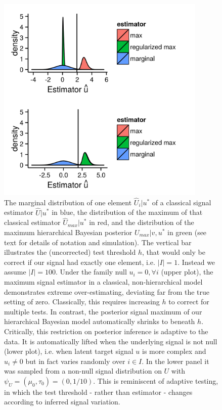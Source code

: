 \documentclass{article}
\begin{document}
\begin{figure}[]
\centering
\includegraphics[width=10cm]{fig}
\caption{The marginal distribution of one element $\hat{U}_i|u^*$ of a classical signal estimator $\hat{U}|u^*$ in blue, the distribution of the maximum of that classical estimator $\hat{U}_{max}|u^*$ in red, and the distribution of the maximum hierarchical Bayesian posterior $U_{max}|v,u^*$ in green (see text for details of notation and simulation). The vertical bar illustrates the (uncorrected) test threshold $h$, that would only be correct if our signal had exactly one element, i.e. $|I|=1$. Instead we assume $|I|=100$. Under the family null $u_i=0,\forall i$ (upper plot), the maximum signal estimator in a classical, non-hierarchical model demonstrates extreme over-estimating, deviating far from the true setting of zero. Classically, this requires increasing $h$ to correct for multiple tests. In contrast, the posterior signal maximum of our hierarchical Bayesian model automatically shrinks to beneath $h$. Critically, this restriction on posterior inference is adaptive to the data. It is automatically lifted when the underlying signal is not null (lower plot), i.e. when latent target signal $u$ is more complex and $u_i \neq 0$ but in fact varies randomly over $i \in I$. In the lower panel it was sampled from a non-null signal distribution on $U$ with $\psi_U=(\mu_0,\tau_0)=(0,1/10)$. This is reminiscent of adaptive testing, in which the test threshold - rather than estimator - changes according to inferred signal variation. }
\label{fig:regularized maxima}
\end{figure}
\end{document}
